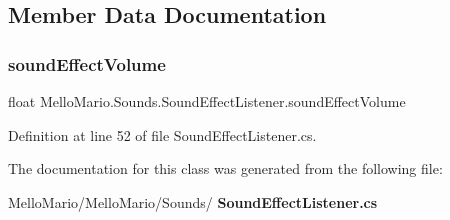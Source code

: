 \subsection{Member Data Documentation}
\mbox{\label{classMelloMario_1_1Sounds_1_1SoundEffectListener_a6858beb8be0190b03f1307f51df31edc}} 
\subsubsection{sound\+Effect\+Volume}
{\footnotesize\ttfamily float Mello\+Mario.\+Sounds.\+Sound\+Effect\+Listener.\+sound\+Effect\+Volume\hspace{0.3cm}{\ttfamily [private]}}



Definition at line 52 of file Sound\+Effect\+Listener.\+cs.



The documentation for this class was generated from the following file\+:\begin{DoxyCompactItemize}
\item 
Mello\+Mario/\+Mello\+Mario/\+Sounds/\textbf{ Sound\+Effect\+Listener.\+cs}\end{DoxyCompactItemize}
